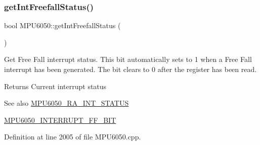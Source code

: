 \begin{DoxyCode}{0}

\end{DoxyCode}
\mbox{\label{classMPU6050_a06bbc2116235b7cc5e28c877e0576749}} 
\subsubsection{\texorpdfstring{getIntFreefallStatus()}{getIntFreefallStatus()}}
{\footnotesize\ttfamily bool M\+P\+U6050\+::get\+Int\+Freefall\+Status (\begin{DoxyParamCaption}{ }\end{DoxyParamCaption})}

Get Free Fall interrupt status. This bit automatically sets to 1 when a Free Fall interrupt has been generated. The bit clears to 0 after the register has been read. \begin{DoxyReturn}{Returns}
Current interrupt status 
\end{DoxyReturn}
\begin{DoxySeeAlso}{See also}
\mbox{\hyperlink{MPU6050_8h_a8337320c5ccc92def830e968d2e19d75}{M\+P\+U6050\+\_\+\+R\+A\+\_\+\+I\+N\+T\+\_\+\+S\+T\+A\+T\+US}} 

\mbox{\hyperlink{MPU6050_8h_a95b5ee3f5f796515c31f0b59f9ce0019}{M\+P\+U6050\+\_\+\+I\+N\+T\+E\+R\+R\+U\+P\+T\+\_\+\+F\+F\+\_\+\+B\+IT}} 
\end{DoxySeeAlso}


Definition at line 2005 of file M\+P\+U6050.\+cpp.


